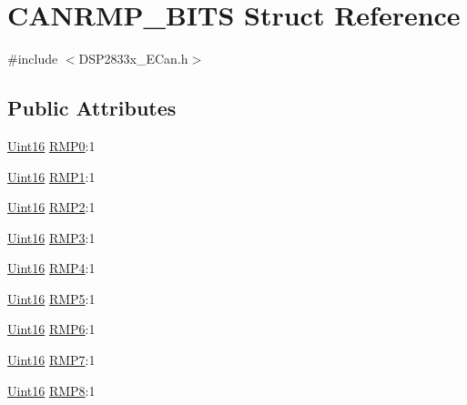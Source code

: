 \hypertarget{struct_c_a_n_r_m_p___b_i_t_s}{}\section{C\+A\+N\+R\+M\+P\+\_\+\+B\+I\+T\+S Struct Reference}
\label{struct_c_a_n_r_m_p___b_i_t_s}


{\ttfamily \#include $<$D\+S\+P2833x\+\_\+\+E\+Can.\+h$>$}

\subsection*{Public Attributes}
\begin{DoxyCompactItemize}
\item 
\hyperlink{_d_s_p2833x___device_8h_a59a9f6be4562c327cbfb4f7e8e18f08b}{Uint16} \hyperlink{struct_c_a_n_r_m_p___b_i_t_s_a86840e17e257fcd2fa38618d9751f542}{R\+M\+P0}\+:1
\item 
\hyperlink{_d_s_p2833x___device_8h_a59a9f6be4562c327cbfb4f7e8e18f08b}{Uint16} \hyperlink{struct_c_a_n_r_m_p___b_i_t_s_a8c814e131146f6a5fcab9f5ab54470a5}{R\+M\+P1}\+:1
\item 
\hyperlink{_d_s_p2833x___device_8h_a59a9f6be4562c327cbfb4f7e8e18f08b}{Uint16} \hyperlink{struct_c_a_n_r_m_p___b_i_t_s_a2abe8f57399cccb8811de28b3ba5d620}{R\+M\+P2}\+:1
\item 
\hyperlink{_d_s_p2833x___device_8h_a59a9f6be4562c327cbfb4f7e8e18f08b}{Uint16} \hyperlink{struct_c_a_n_r_m_p___b_i_t_s_a0d65412935e69971dde372a8c154f4eb}{R\+M\+P3}\+:1
\item 
\hyperlink{_d_s_p2833x___device_8h_a59a9f6be4562c327cbfb4f7e8e18f08b}{Uint16} \hyperlink{struct_c_a_n_r_m_p___b_i_t_s_ae16c32ea9ccb835f6cb4b404f3ffb8eb}{R\+M\+P4}\+:1
\item 
\hyperlink{_d_s_p2833x___device_8h_a59a9f6be4562c327cbfb4f7e8e18f08b}{Uint16} \hyperlink{struct_c_a_n_r_m_p___b_i_t_s_adeda1a44328aa2fa63646f09633c52a6}{R\+M\+P5}\+:1
\item 
\hyperlink{_d_s_p2833x___device_8h_a59a9f6be4562c327cbfb4f7e8e18f08b}{Uint16} \hyperlink{struct_c_a_n_r_m_p___b_i_t_s_a3e2750da3d02baa13c0405b80229a5f6}{R\+M\+P6}\+:1
\item 
\hyperlink{_d_s_p2833x___device_8h_a59a9f6be4562c327cbfb4f7e8e18f08b}{Uint16} \hyperlink{struct_c_a_n_r_m_p___b_i_t_s_acab05f25e29c2c059efcdbcff02467a2}{R\+M\+P7}\+:1
\item 
\hyperlink{_d_s_p2833x___device_8h_a59a9f6be4562c327cbfb4f7e8e18f08b}{Uint16} \hyperlink{struct_c_a_n_r_m_p___b_i_t_s_a7d0a4739fe45f8af81cd13251778ace7}{R\+M\+P8}\+:1

\end{DoxyCompactItemize}
